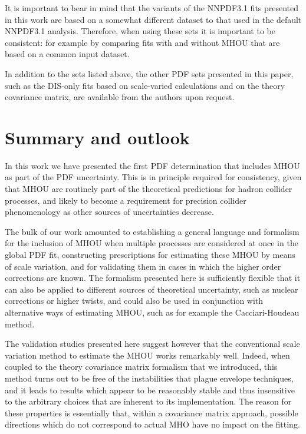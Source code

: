 It is  important to bear in mind
that the variants of the NNPDF3.1 fits presented in this work
are based on a somewhat different dataset to that used in the default 
NNPDF3.1 analysis.
%
Therefore, when using these sets it is important to be consistent:
for example by
comparing fits with and without MHOU that are based on a common input dataset.

In addition to the sets listed above, the other PDF sets presented in this paper, such as the DIS-only fits based on scale-varied calculations and on the theory covariance matrix, are available from the authors upon request.

\section{Summary and outlook}
\label{sec:summary}

In this work we have presented the first PDF determination that includes 
MHOU as part of the PDF uncertainty.
%
This is in principle required for consistency,
given that MHOU are routinely part of the theoretical predictions for hadron
collider processes, and likely to become a requirement for precision collider
phenomenology as other sources of uncertainties decrease.

The bulk of our work amounted to establishing a general
language and formalism for the inclusion of MHOU when multiple
processes  are considered at once in the global PDF fit, constructing 
prescriptions for
estimating these MHOU by means of scale variation, and for validating them
in cases in which the higher order corrections are known.
%
The formalism presented here is sufficiently flexible that it can also be
applied to different sources of theoretical uncertainty, such as nuclear
corrections or higher twists, and could also be used in
conjunction with alternative ways of estimating MHOU, such as for example 
the Cacciari-Houdeau method.

The validation studies presented here suggest however that the conventional 
scale variation method to estimate the MHOU works remarkably well.
%
Indeed, when coupled to the
theory covariance matrix formalism that we introduced, this method turns 
out to be free of
the instabilities that plague envelope techniques, and it leads to results
which appear to be reasonably stable and thus insensitive to the arbitrary
choices that are inherent to its implementation.
%
The reason for these properties is
essentially that, within a covariance matrix approach, possible
directions which do not correspond to actual MHO have no impact on the fitting.

